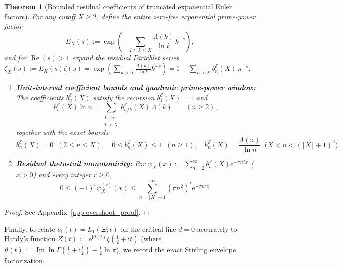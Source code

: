 \documentclass[11pt,reqno]{amsart}
\newtheorem{theorem}{Theorem}[section]
\theoremstyle{definition}
\theoremstyle{remark}
\numberwithin{equation}{section}
\newcommand{\ii}{\mathrm{i}}
\newcommand{\ee}{\mathrm{e}}
\newcommand{\Rea}{\operatorname{Re}}
\newcommand{\Ima}{\operatorname{Im}}
\begin{document}
\begin{theorem}[Bounded residual coefficients of truncated exponential Euler factors]\label{thm:prime_gauge_sieve}
For any cutoff $X \ge 2$, define the entire zero-free exponential prime-power factor
\begin{equation}\label{eq:E_X_def}
  E_X(s) := \exp\!\left(-\sum_{2 \le k \le X}\frac{\Lambda(k)}{\ln k}\,k^{-s}\right),
\end{equation}
and for $\Rea(s) > 1$ expand the residual Dirichlet series $\zeta_X(s) := E_X(s)\zeta(s) = \exp(\sum_{k > X}\frac{\Lambda(k)}{\ln k}k^{-s}) = 1 + \sum_{n > X} b_n^{\mathcal{E}}(X)\,n^{-s}$.
\begin{enumerate}[label=\textup{(\arabic*)},leftmargin=2.2em]
  \item \textbf{Unit-interval coefficient bounds and quadratic prime-power window:} The coefficients $b_n^{\mathcal{E}}(X)$ satisfy the recursion $b_1^{\mathcal{E}}(X) = 1$ and
  \begin{equation}\label{eq:b_n_E_recursion}
    b_n^{\mathcal{E}}(X)\ln n = \sum_{\substack{k \mid n \\ k > X}} b_{n/k}^{\mathcal{E}}(X)\,\Lambda(k) \qquad (n \ge 2),
  \end{equation}
  together with the exact bounds
  \begin{equation}\label{eq:b_n_E_bounds}
    b_n^{\mathcal{E}}(X) = 0 \;\; (2 \le n \le X), \quad
    0 \le b_n^{\mathcal{E}}(X) \le 1 \;\; (n \ge 1), \quad
    b_n^{\mathcal{E}}(X) = \frac{\Lambda(n)}{\ln n} \;\; \bigl(X < n < (\lfloor X\rfloor + 1)^2\bigr).
  \end{equation}
  \item \textbf{Residual theta-tail monotonicity:} For $\psi_X(x) := \sum_{n=2}^\infty b_n^{\mathcal{E}}(X)\ee^{-\pi n^2 x}$ ($x > 0$) and every integer $r \ge 0$,
  \begin{equation}\label{eq:theta_tail_bound}
    0 \le (-1)^r \psi_X^{(r)}(x) \le \sum_{n = \lfloor X\rfloor + 1}^{\infty} (\pi n^2)^r \ee^{-\pi n^2 x}.
  \end{equation}
\end{enumerate}
\end{theorem}

\begin{proof}
See Appendix~\ref{app:overshoot_proof}.
\end{proof}

Finally, to relate $c_1(t) = L_1(\Xi; t)$ on the critical line $d = 0$ accurately to Hardy's function $Z(t) := \ee^{\ii\vartheta(t)}\zeta(\frac{1}{2}+\ii t)$ (where $\vartheta(t) := \Ima\ln\Gamma(\frac{1}{4}+\ii\frac{t}{2}) - \frac{t}{2}\ln\pi$), we record the exact Stirling envelope factorization.
\end{document}
